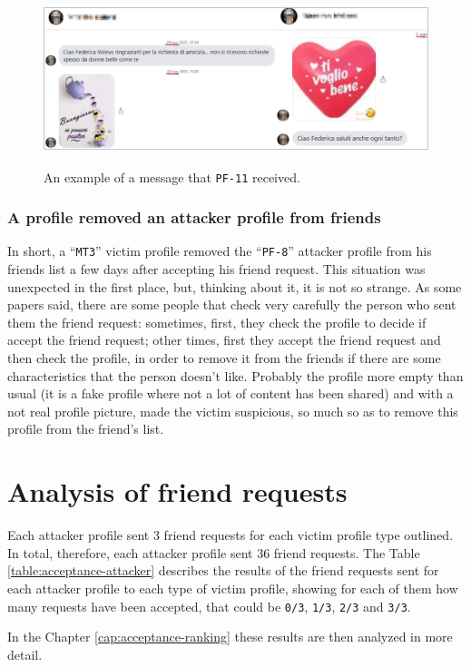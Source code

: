 \begin{figure}[H]
\centering
	\caption{An example of a message that \texttt{PF-11} received.}
	\label{fig:message-PF-11}
	\includegraphics[height=5cm]{immagini/pf-11.png} 
\end{figure}
\subsubsection*{A profile removed an attacker profile from friends}
\label{cap:discuss-removed-friends}
In short, a ``\texttt{MT3}'' victim profile removed the ``\texttt{PF-8}'' attacker profile from his friends list a few days after accepting his friend request. This situation was unexpected in the first place, but, thinking about it, it is not so strange. As some papers said, there are some people that check very carefully the person who sent them the friend request: sometimes, first, they check the profile to decide if accept the friend request; other times, first they accept the friend request and then check the profile, in order to remove it from the friends if there are some characteristics that the person doesn't like. Probably the profile more empty than usual (it is a fake profile where not a lot of content has been shared) and with a not real profile picture, made the victim suspicious, so much so as to remove this profile from the friend's list.

\newpage
\section{Analysis of friend requests}
\label{cap:friend-request-sent}
Each attacker profile sent 3 friend requests for each victim profile type outlined. In total, therefore, each attacker profile sent 36 friend requests. The Table \ref{table:acceptance-attacker} describes the results of the friend requests sent for each attacker profile to each type of victim profile, showing for each of them how many requests have been accepted, that could be \texttt{0/3}, \texttt{1/3}, \texttt{2/3} and \texttt{3/3}.
\par \noindent In the Chapter \ref{cap:acceptance-ranking} these results are then analyzed in more detail.

